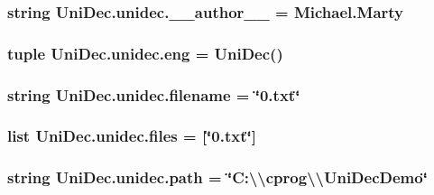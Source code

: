 \subsubsection[{\+\_\+\+\_\+author\+\_\+\+\_\+}]{\setlength{\rightskip}{0pt plus 5cm}string Uni\+Dec.\+unidec.\+\_\+\+\_\+author\+\_\+\+\_\+ = \textquotesingle{}Michael.\+Marty\textquotesingle{}}\label{namespace_uni_dec_1_1unidec_a365cc7ad629c4814f376796249dbfe4a}
\hypertarget{namespace_uni_dec_1_1unidec_a7c2c0858768f54afe4bf25593484db90}{}
\subsubsection[{eng}]{\setlength{\rightskip}{0pt plus 5cm}tuple Uni\+Dec.\+unidec.\+eng = {\bf Uni\+Dec}()}\label{namespace_uni_dec_1_1unidec_a7c2c0858768f54afe4bf25593484db90}
\hypertarget{namespace_uni_dec_1_1unidec_a646d6d6d853ea2dcd80859bdb716adce}{}
\subsubsection[{filename}]{\setlength{\rightskip}{0pt plus 5cm}string Uni\+Dec.\+unidec.\+filename = \char`\"{}0.txt\char`\"{}}\label{namespace_uni_dec_1_1unidec_a646d6d6d853ea2dcd80859bdb716adce}
\hypertarget{namespace_uni_dec_1_1unidec_a93a2af3de42083407c2a7c89e6601995}{}
\subsubsection[{files}]{\setlength{\rightskip}{0pt plus 5cm}list Uni\+Dec.\+unidec.\+files = \mbox{[}\char`\"{}0.txt\char`\"{}\mbox{]}}\label{namespace_uni_dec_1_1unidec_a93a2af3de42083407c2a7c89e6601995}
\hypertarget{namespace_uni_dec_1_1unidec_a7ad712bf884f73733763f363176d209f}{}
\subsubsection[{path}]{\setlength{\rightskip}{0pt plus 5cm}string Uni\+Dec.\+unidec.\+path = \char`\"{}C\+:\textbackslash{}\textbackslash{}cprog\textbackslash{}\textbackslash{}\+Uni\+Dec\+Demo\char`\"{}}\label{namespace_uni_dec_1_1unidec_a7ad712bf884f73733763f363176d209f}
